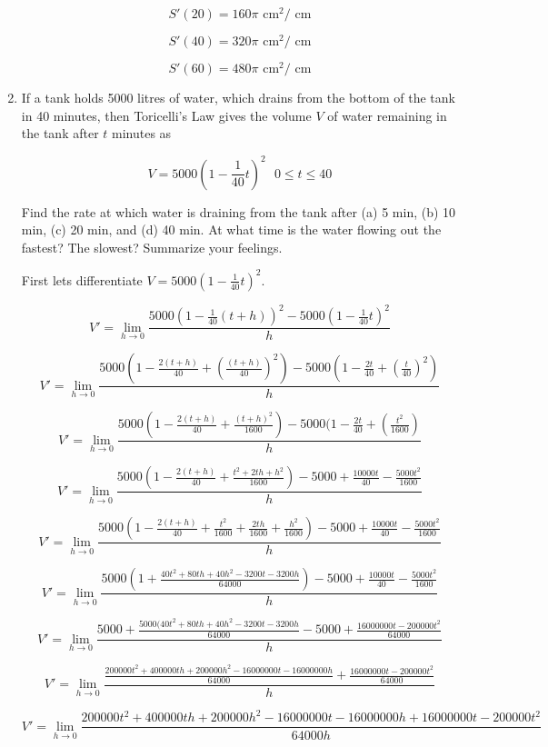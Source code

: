 \documentclass{article}
\begin{document}
\begin{enumerate}
					$$S'(20) = 160\pi \text{ cm}^2 /\text{ cm}$$

					$$S'(40) = 320\pi \text{ cm}^2 /\text{ cm}$$

					$$S'(60) = 480\pi \text{ cm}^2 /\text{ cm}$$

				\item If a tank holds 5000 litres of water, which drains from the bottom of the tank
					in 40 minutes, then Toricelli's Law gives the volume $V$ of water remaining
					in the tank after $t$ minutes as

					$$V = 5000(1 - \frac{1}{40}t)^2 \text{	} 0 \leq t \leq 40$$

					Find the rate at which water is draining from the tank after (a) 5 min,
					(b) 10 min, (c) 20 min, and (d) 40 min. At what time is the water
					flowing out the fastest? The slowest? Summarize your feelings.

					First lets differentiate $V = 5000(1 - \frac{1}{40}t)^2$.

	$$V' =  \lim _{h \to 0} \frac{5000(1 - \frac{1}{40}(t + h))^2 - 5000(1 - \frac{1}{40}t)^2}{h}$$

	$$V' = \lim _{h \to 0} \frac{5000(1 - \frac{2(t+h)}{40} + (\frac{(t+h)}{40})^2) - 5000(1 - \frac{2t}{40} + (\frac{t}{40})^2)}{h}$$

	$$V' = \lim _{h \to 0} \frac{5000(1 - \frac{2(t+h)}{40} + \frac{(t+h)^2}{1600}) - 5000(1 - \frac{2t}{40} + (\frac{t^2}{1600})}{h}$$

	$$V' = \lim _{h \to 0} \frac{5000(1 - \frac{2(t+h)}{40} + \frac{t^2 + 2th + h^2}{1600}) - 5000 + \frac{10000t}{40} - \frac{5000t^2}{1600}}{h}$$

	$$V' = \lim _{h \to 0} \frac{5000(1 - \frac{2(t+h)}{40} + \frac{t^2}{1600} + \frac{2th}{1600} + \frac{h^2}{1600}) - 5000 + \frac{10000t}{40} - \frac{5000t^2}{1600}}{h}$$

	
	$$V' = \lim _{h \to 0} \frac{5000(1 + \frac{40t^2 + 80th + 40h^2 - 3200t - 3200h}{64000}) - 5000 + \frac{10000t}{40} - \frac{5000t^2}{1600}}{h}$$

	$$V' = \lim _{h \to 0} \frac{5000 + \frac{5000(40t^2 + 80th + 40h^2 - 3200t - 3200h}{64000} - 5000 + \frac{16000000t - 200000t^2}{64000}}{h}$$

	$$V' = \lim _{h \to 0} \frac{\frac{200000t^2 + 400000th + 200000h^2 - 16000000t - 16000000h}{64000} + \frac{16000000t - 200000t^2}{64000}}{h}$$

	$$V' = \lim _{h \to 0} \frac{200000t^2 + 400000th + 200000h^2 - 16000000t - 16000000h + 16000000t - 200000t^2}{64000h}$$


\end{enumerate}
\end{document}

